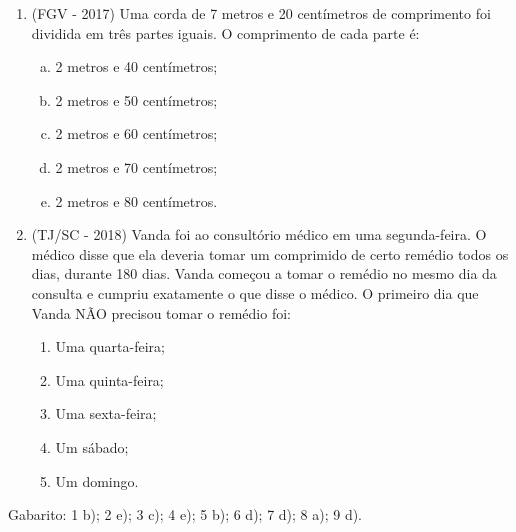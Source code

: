 \begin{enumerate}
  
   \item (FGV - 2017) Uma corda de 7 metros e 20 centímetros de comprimento foi dividida em três partes iguais. O comprimento de cada parte é: 
 
  \begin{enumerate}[a)]
  \item 2 metros e 40 centímetros;
  \item 2 metros e 50 centímetros;
  \item 2 metros e 60 centímetros;
  \item 2 metros e 70 centímetros;
  \item 2 metros e 80 centímetros.
  \end{enumerate}
  
 \item (TJ/SC - 2018) Vanda foi ao consultório médico em uma segunda-feira. O médico disse que ela deveria tomar um comprimido de certo remédio todos os dias, durante 180 dias. Vanda começou a tomar o remédio no mesmo dia da consulta e cumpriu exatamente o que disse o médico.
  O primeiro dia que Vanda NÃO precisou tomar o remédio foi:
  \begin{enumerate}
  \item Uma quarta-feira;
  \item Uma quinta-feira;
  \item Uma sexta-feira;
  \item Um sábado;
  \item Um domingo.
 \end{enumerate}
 \end{enumerate}

 Gabarito: 1 b); 2 e); 3 c); 4 e); 5 b); 6 d); 7 d); 8 a); 9 d).
 


